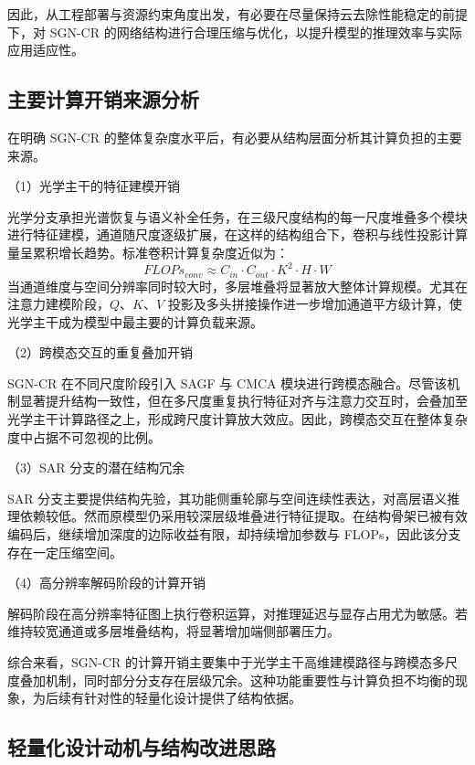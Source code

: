 因此，从工程部署与资源约束角度出发，有必要在尽量保持云去除性能稳定的前提下，对 SGN-CR 的网络结构进行合理压缩与优化，以提升模型的推理效率与实际应用适应性。

\subsection{主要计算开销来源分析}

在明确 SGN-CR 的整体复杂度水平后，有必要从结构层面分析其计算负担的主要来源。

（1）光学主干的特征建模开销

光学分支承担光谱恢复与语义补全任务，在三级尺度结构的每一尺度堆叠多个模块进行特征建模，通道随尺度逐级扩展，在这样的结构组合下，卷积与线性投影计算量呈累积增长趋势。标准卷积计算复杂度近似为：
\begin{equation}
{FLOPs}_{conv} \approx C_{in}\cdot C_{out}\cdot K^2\cdot H\cdot W
\end{equation}
当通道维度与空间分辨率同时较大时，多层堆叠将显著放大整体计算规模。尤其在注意力建模阶段，$Q$、$K$、$V$ 投影及多头拼接操作进一步增加通道平方级计算，使光学主干成为模型中最主要的计算负载来源。

（2）跨模态交互的重复叠加开销

SGN-CR 在不同尺度阶段引入 SAGF 与 CMCA 模块进行跨模态融合。尽管该机制显著提升结构一致性，但在多尺度重复执行特征对齐与注意力交互时，会叠加至光学主干计算路径之上，形成跨尺度计算放大效应。因此，跨模态交互在整体复杂度中占据不可忽视的比例。

（3）SAR 分支的潜在结构冗余

SAR 分支主要提供结构先验，其功能侧重轮廓与空间连续性表达，对高层语义推理依赖较低。然而原模型仍采用较深层级堆叠进行特征提取。在结构骨架已被有效编码后，继续增加深度的边际收益有限，却持续增加参数与 FLOPs，因此该分支存在一定压缩空间。

（4）高分辨率解码阶段的计算开销

解码阶段在高分辨率特征图上执行卷积运算，对推理延迟与显存占用尤为敏感。若维持较宽通道或多层堆叠结构，将显著增加端侧部署压力。

综合来看，SGN-CR 的计算开销主要集中于光学主干高维建模路径与跨模态多尺度叠加机制，同时部分分支存在层级冗余。这种功能重要性与计算负担不均衡的现象，为后续有针对性的轻量化设计提供了结构依据。

\subsection{轻量化设计动机与结构改进思路}

